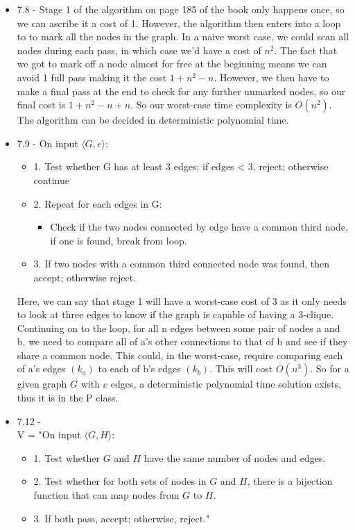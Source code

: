 \documentclass{article}
\begin{document}
\begin{itemize}
  \item 7.8 - Stage 1 of the algorithm on page 185 of the book only happens once, so we can ascribe it a cost of 1. However, the algorithm then enters into a loop to to mark all the nodes in the graph. In a naive worst case, we could scan all nodes during each pass, in which case we'd have a cost of $n^{2}$. The fact that we got to mark off a node almost for free at the beginning means we can avoid 1 full pass making it the cost $1 + n^{2} - n$. However, we then have to make a final pass at the end to check for any further unmarked nodes, so our final cost is $1 + n^{2} - n + n$. So our worst-case time complexity is $O(n^{2})$. The algorithm can be decided in deterministic polynomial time.
  \item 7.9 - On input $\langle G,e \rangle$: \\
    \begin{itemize}
      \item 1. Test whether G has at least 3 edges; if edges < 3, reject; otherwise continue
      \item 2. Repeat for each edges in G:
        \begin{itemize}
          \item Check if the two nodes connected by edge have a common third node, if one is found, break from loop.
        \end{itemize}
      \item 3. If two nodes with a common third connected node was found, then accept; otherwise reject.
    \end{itemize}
    Here, we can say that stage 1 will have a worst-case cost of 3 as it only needs to look at three edges to know if the graph is capable of having a 3-clique. Continuing on to the loop, for all n edges between some pair of nodes a and b, we need to compare all of a's other connections to that of b and see if they share a common node. This could, in the worst-case, require comparing each of a's edges $(k_{a})$ to each of b's edges $(k_{b})$. This will cost $O(n^{3})$. So for a given graph $G$ with $e$ edges, a deterministic polynomial time solution exists, thus it is in the P class.
  \item 7.12 - \\
    V = "On input $\langle G,H \rangle$:
    \begin{itemize}
      \item 1. Test whether $G$ and $H$ have the same number of nodes and edges.
      \item 2. Test whether for both sets of nodes in $G$ and $H$, there is a bijection function that can map nodes from $G$ to $H$.
      \item 3. If both pass, accept; otherwise, reject."
    \end{itemize}
\end{itemize}
\end{document}
